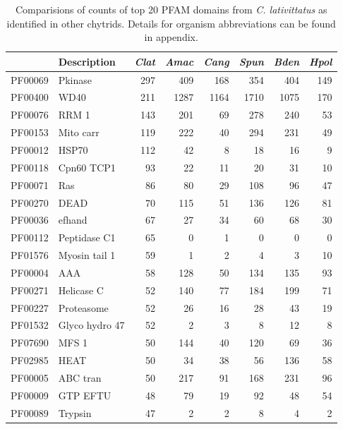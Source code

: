 
\begin{table}[htbp]
\caption[Top 20 PFAM domain counts]{Comparisions of counts of top 20 PFAM domains from \textit{C. lativittatus} as identified in other chytrids. Details for organism abbreviations can be found in appendix.} 
\label{tab:ChClat_PFAM}
\begin{tabular}{rlrrrrrr}
  \hline
 & Description & \emph{Clat} & \emph{Amac} & \emph{Cang} & \emph{Spun} & \emph{Bden} & \emph{Hpol} \\ 
  \hline
PF00069 & Pkinase & 297 & 409 & 168 & 354 & 404 & 149 \\ 
  PF00400 & WD40 & 211 & 1287 & 1164 & 1710 & 1075 & 170 \\ 
  PF00076 & RRM 1 & 143 & 201 &  69 & 278 & 240 &  53 \\ 
  PF00153 & Mito carr & 119 & 222 &  40 & 294 & 231 &  49 \\ 
  PF00012 & HSP70 & 112 &  42 &  8 &  18 &  16 &   9 \\ 
  PF00118 & Cpn60 TCP1 &  93 &  22 &  11 &  20 &  31 &  10 \\ 
  PF00071 & Ras &  86 &  80 &  29 & 108 &  96 &  47 \\ 
  PF00270 & DEAD &  70 & 115 &  51 & 136 & 126 &  81 \\ 
  PF00036 & efhand &  67 &  27 &  34 &  60 &  68 &  30 \\ 
  PF00112 & Peptidase C1 &  65 &   0 &   1 &   0 &   0 &   0 \\ 
  PF01576 & Myosin tail 1 &  59 &   1 &  2 &   4 &   3 &  10 \\ 
  PF00004 & AAA &  58 & 128 & 50 & 134 & 135 &  93 \\ 
  PF00271 & Helicase C &  52 & 140 &  77 & 184 & 199 &  71 \\ 
  PF00227 & Proteasome &  52 &  26 &  16 &  28 &  43 &  19 \\ 
  PF01532 & Glyco hydro 47 &  52 &   2 &   3 &   8 &  12 &   8 \\ 
  PF07690 & MFS 1 &  50 & 144 &  40 & 120 &  69 &  36 \\ 
  PF02985 & HEAT &  50 &  34 &  38 &  56 & 136 &  58 \\ 
  PF00005 & ABC tran &  50 & 217 & 91 & 168 & 231 &  96 \\ 
  PF00009 & GTP EFTU &  48 &  79 &  19 &  92 &  48 &  54 \\ 
  PF00089 & Trypsin &  47 &   2 &   2 &   8 &   4 &   2 \\ 
   \hline
\end{tabular}
\end{table}
